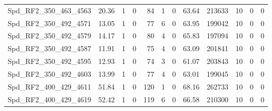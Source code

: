 \begin{longtable}[c]{@{}lrrrrrrrrrrr@{}}
Spd\_RF2\_350\_463\_4563      & 20.36                  & 1                       & 0                       & 84                     & 1                       & 0                       & 63.64                   & 213633                   & 10                       & 0                        & 0                        \\
Spd\_RF2\_350\_492\_4571      & 13.05                  & 1                       & 0                       & 77                     & 6                       & 0                       & 63.95                   & 199042                   & 10                       & 0                        & 0                        \\
Spd\_RF2\_350\_492\_4579      & 14.17                  & 1                       & 0                       & 80                     & 4                       & 0                       & 65.83                   & 197094                   & 10                       & 0                        & 0                        \\
Spd\_RF2\_350\_492\_4587      & 11.91                  & 1                       & 0                       & 75                     & 4                       & 0                       & 63.09                   & 201841                   & 10                       & 0                        & 0                        \\
Spd\_RF2\_350\_492\_4595      & 12.93                  & 1                       & 0                       & 74                     & 3                       & 0                       & 61.07                   & 203843                   & 10                       & 0                        & 0                        \\
Spd\_RF2\_350\_492\_4603      & 13.99                  & 1                       & 0                       & 77                     & 4                       & 0                       & 63.01                   & 199045                   & 10                       & 0                        & 0                        \\
Spd\_RF2\_400\_429\_4611      & 51.84                  & 1                       & 0                       & 120                    & 1                       & 0                       & 68.16                   & 262733                   & 10                       & 0                        & 0                        \\
Spd\_RF2\_400\_429\_4619      & 52.42                  & 1                       & 0                       & 119                    & 6                       & 0                       & 66.58                   & 210300                   & 10                       & 0                        & 0                        \\

\end{longtable}
